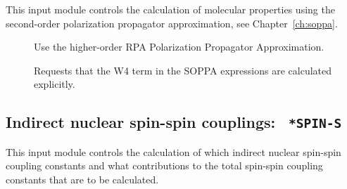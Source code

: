 This input module controls the calculation of molecular properties
using the second-order polarization propagator approximation, see
Chapter~\ref{ch:soppa}. 

\begin{description}
\item[] Use the higher-order RPA Polarization Propagator
  Approximation.

\item[] Requests that the W4 term in the SOPPA expressions
  are calculated explicitly.
\end{description}

\subsection{Indirect nuclear spin-spin couplings: {\tt
*SPIN-S}}\label{sec:spin-s}

This input module controls the calculation of which indirect nuclear
spin-spin coupling constants and what contributions to the total
spin-spin coupling constants that are to be calculated.

